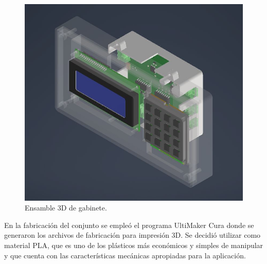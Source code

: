 \begin{figure}[h!]
	\centering
	\includegraphics[scale=.6]{./Figures/asm_3d.JPG}
	\caption{Ensamble 3D de gabinete.}
	\label{fig:ensamble}
\end{figure}

\newpage

En la fabricación del conjunto se empleó el programa UltiMaker Cura\citep{web_cura3d} donde se generaron los archivos de fabricación para impresión 3D. Se decidió utilizar como material PLA, que es uno de los plásticos más económicos y simples de manipular y que cuenta con las características mecánicas apropiadas para la aplicación.